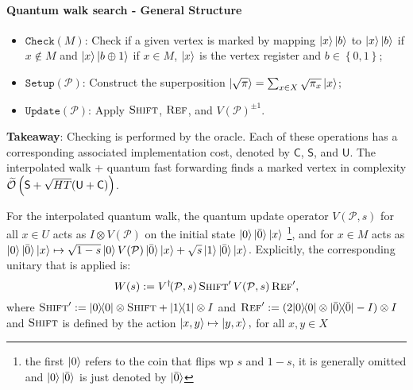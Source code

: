 \documentclass{article}
\newcommand{\ketbra}[2]{|#1\rangle\! \langle #2|}
\newcommand{\bigOt}[1]{\widetilde{\mathcal{O}}\left( #1 \right)}
\newcommand{\PM}{\mathcal{P}}
\newcommand\lrb[1]{\left\lbrace #1 \right\rbrace}
\renewcommand{\check}{\mathtt{Check}}
\newcommand{\setup}{\mathtt{Setup}}
\newcommand{\update}{\mathtt{Update}}
\newcommand{\checkingcost}{\mathsf{C}}
\newcommand{\setupcost}{\mathsf{S}}
\newcommand{\updatecost}{\mathsf{U}}
\newcommand{\barO}{\bar{0}}
\begin{document}
\paragraph{Quantum walk search - General Structure}
\begin{itemize}
	\item $\check(M)$: Check if a given vertex is marked
	by mapping $\ket{x} \ket{b}$ to $\ket{x} \ket{b}$ if $x \notin M$ and $\ket{x} \ket{b \oplus 1}$ if $x \in M$, $\ket{x}$ is the vertex register and $b \in \lrb{0,1}$;
	\item $\setup(\PM )$: Construct the superposition $\ket{\sqrt \pi}  = \sum_{x \in X} \sqrt{\pi_x} \ket{x}$;
	\item $\update(\PM)$: Apply $\textsc{Shift}$, $\textsc{Ref}$, and $V(\PM)^{\pm1}$.
\end{itemize}
\textbf{Takeaway}: Checking is performed by the oracle. Each of these operations has a corresponding associated implementation cost, denoted by $\checkingcost$, $\setupcost$, and $\updatecost$. 
The interpolated walk + quantum fast forwarding finds a marked vertex in complexity $\bigOt{{\sf S}+\sqrt{HT}({\sf U}+{\sf C})}$.

For the interpolated quantum walk, the quantum update operator $V(\PM,s)$ for all $x\in U$ acts as $I\otimes V(\PM)$ on the initial state $\ket{0}\ket{\barO}\ket{x}$ \footnote{the first $\ket{0}$ refers to the coin that flips wp $s$ and $1-s$, it is generally omitted and $\ket{0}\ket{\barO}$ is just denoted by $\ket{\barO}$}, and for $x\in M$ acts as $\ket{0}\ket{\barO}\ket{x}\mapsto \sqrt{1-s}\ket{0}V(\PM)\ket{\barO}\ket{x} + \sqrt{s}\ket{1}\ket{\barO}\ket{x}$. Explicitly, the corresponding unitary that is applied is:
\begin{equation}
W(s):=V^\dagger\!(\PM,s) \,\textsc{Shift}'\, V(\PM,s)\, \textsc{Ref}',
\end{equation}
where $\textsc{Shift}':=\ketbra{0}{0}\otimes\textsc{Shift}+\ketbra{1}{1}\otimes I$ and $\textsc{Ref}':=(2\ketbra{0}{0}\otimes\ketbra{\barO}{\barO}-I)\otimes I$ and $\textsc{Shift}$ is defined by the action $\ket{x,y}\mapsto\ket{y,x},$
for all $x,y\in X$
\end{document}
